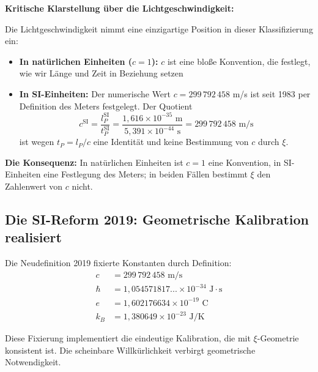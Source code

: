 	\begin{warning}
		\textbf{Kritische Klarstellung über die Lichtgeschwindigkeit:}
		
		Die Lichtgeschwindigkeit nimmt eine einzigartige Position in dieser Klassifizierung ein:
		
		\begin{itemize}
			\item \textbf{In natürlichen Einheiten ($c = 1$):} $c$ ist eine bloße Konvention, die festlegt, wie wir Länge und Zeit in Beziehung setzen
			
			\item \textbf{In SI-Einheiten:} Der numerische Wert $c = 299\,792\,458$ m/s ist seit 1983 per Definition des Meters festgelegt. Der Quotient
			\begin{equation}
				c^{\text{SI}} = \frac{l_P^{\text{SI}}}{t_P^{\text{SI}}} = \frac{1{,}616 \times 10^{-35} \text{ m}}{5{,}391 \times 10^{-44} \text{ s}} = 299\,792\,458 \text{ m/s}
			\end{equation}
			ist wegen $t_P = l_P/c$ eine Identität und keine Bestimmung von $c$ durch $\xi$.
		\end{itemize}
		
		\textbf{Die Konsequenz:} In natürlichen Einheiten ist $c = 1$ eine Konvention, in SI-Einheiten eine Festlegung des Meters; in beiden Fällen bestimmt $\xi$ den Zahlenwert von $c$ nicht.
	\end{warning}
	
	\subsection{Die SI-Reform 2019: Geometrische Kalibration realisiert}
	
	Die Neudefinition 2019 fixierte Konstanten durch Definition:
	\begin{align}
		c &= 299\,792\,458 \text{ m/s} \\
		\hbar &= 1{,}054571817... \times 10^{-34} \text{ J}\cdot\text{s} \\
		e &= 1{,}602176634 \times 10^{-19} \text{ C} \\
		k_B &= 1{,}380649 \times 10^{-23} \text{ J/K}
	\end{align}
	
	\begin{insight}
		Diese Fixierung implementiert die eindeutige Kalibration, die mit $\xi$-Geometrie konsistent ist. Die scheinbare Willkürlichkeit verbirgt geometrische Notwendigkeit.
	\end{insight}
	
